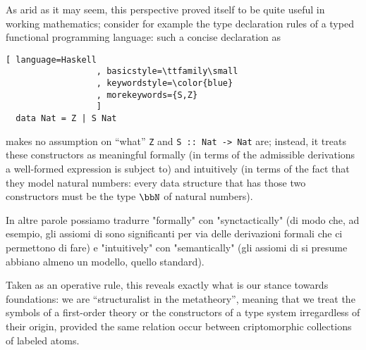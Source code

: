 As arid as it may seem, this perspective proved itself to be quite useful in working mathematics; consider for example the type declaration rules of a typed functional programming language: such a concise declaration as
\begin{lstlisting}[ language=Haskell
                  , basicstyle=\ttfamily\small
                  , keywordstyle=\color{blue}
                  , morekeywords={S,Z}
                  ]
  data Nat = Z | S Nat
\end{lstlisting}
makes no assumption on ``what'' \verb|Z| and \verb|S :: Nat -> Nat| are;%
instead, it treats these constructors as meaningful formally (in terms of the admissible derivations a well-formed expression is subject to) and intuitively (in terms of the fact that they model natural numbers: every data structure that has those two constructors must be the type $\bbN$ of natural numbers). 

In altre parole possiamo tradurre "formally" con "synctactically" (di modo che, ad esempio, gli assiomi di  sono significanti per via delle derivazioni formali che ci permettono di fare) e "intuitively" con "semantically" (gli assiomi di  si presume abbiano almeno un modello, quello standard).

Taken as an operative rule, this reveals exactly what is our stance towards foundations: we are ``structuralist in the metatheory'', meaning that we treat the symbols of a first-order theory or the constructors of a type system irregardless of their origin, provided the same relation occur between criptomorphic collections of labeled atoms.

